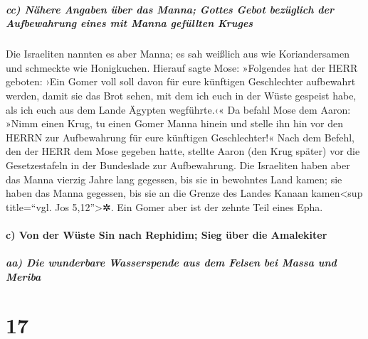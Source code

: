 \hypertarget{cc-nuxe4here-angaben-uxfcber-das-manna-gottes-gebot-bezuxfcglich-der-aufbewahrung-eines-mit-manna-gefuxfcllten-kruges}{%
\subparagraph{cc) Nähere Angaben über das Manna; Gottes Gebot bezüglich
der Aufbewahrung eines mit Manna gefüllten
Kruges}\label{cc-nuxe4here-angaben-uxfcber-das-manna-gottes-gebot-bezuxfcglich-der-aufbewahrung-eines-mit-manna-gefuxfcllten-kruges}}

 Die Israeliten nannten es aber Manna; es sah weißlich
aus wie Koriandersamen und schmeckte wie Honigkuchen. 
Hierauf sagte Mose: »Folgendes hat der HERR geboten: ›Ein Gomer voll
soll davon für eure künftigen Geschlechter aufbewahrt werden, damit sie
das Brot sehen, mit dem ich euch in der Wüste gespeist habe, als ich
euch aus dem Lande Ägypten wegführte.‹«  Da befahl Mose
dem Aaron: »Nimm einen Krug, tu einen Gomer Manna hinein und stelle ihn
hin vor den HERRN zur Aufbewahrung für eure künftigen Geschlechter!«
 Nach dem Befehl, den der HERR dem Mose gegeben hatte,
stellte Aaron (den Krug später) vor die Gesetzestafeln in der Bundeslade
zur Aufbewahrung.  Die Israeliten haben aber das Manna
vierzig Jahre lang gegessen, bis sie in bewohntes Land kamen; sie haben
das Manna gegessen, bis sie an die Grenze des Landes Kanaan
kamen\textless sup title=``vgl. Jos 5,12''\textgreater✲. 
Ein Gomer aber ist der zehnte Teil eines Epha.

\hypertarget{c-von-der-wuxfcste-sin-nach-rephidim-sieg-uxfcber-die-amalekiter}{%
\paragraph{c) Von der Wüste Sin nach Rephidim; Sieg über die
Amalekiter}\label{c-von-der-wuxfcste-sin-nach-rephidim-sieg-uxfcber-die-amalekiter}}

\hypertarget{aa-die-wunderbare-wasserspende-aus-dem-felsen-bei-massa-und-meriba}{%
\subparagraph{aa) Die wunderbare Wasserspende aus dem Felsen bei Massa
und
Meriba}\label{aa-die-wunderbare-wasserspende-aus-dem-felsen-bei-massa-und-meriba}}

\hypertarget{section-16}{%
\section{17}\label{section-16}}

